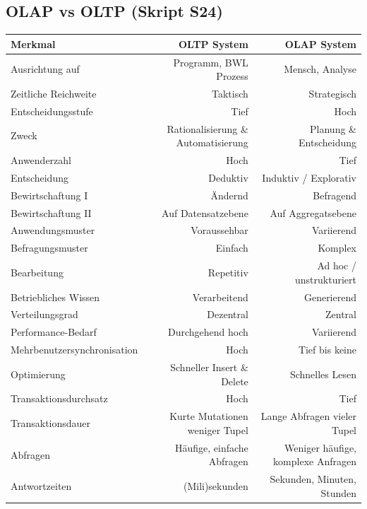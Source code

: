\documentclass[a4paper, 11pt, nofootinbib]{article}
\begin{document}
\begin{landscape}
\subsection{OLAP vs OLTP (Skript S24)}
	
	\centering
	
	\begin{tabular}[htbp]{|l|r|r|}
		\hline 
		Merkmal & OLTP System  & OLAP System  \\ 
		\hline 
		Ausrichtung auf & Programm, BWL Prozess & Mensch, Analyse\\ 
		\hline 
		Zeitliche Reichweite & Taktisch & Strategisch \\ 
		\hline 
		Entscheidungsstufe & Tief & Hoch \\ 
		\hline
		Zweck & Rationalisierung \& Automatisierung & Planung \& Entscheidung \\
		\hline
		Anwenderzahl &Hoch & Tief \\
		\hline
		Entscheidung & Deduktiv & Induktiv / Explorativ \\
		\hline
		Bewirtschaftung I & Ändernd & Befragend \\
		\hline
		Bewirtschaftung II & Auf Datensatzebene & Auf Aggregatsebene \\
		\hline
		Anwendungsmuster & Voraussehbar & Variierend \\
		\hline
		Befragungsmuster & Einfach & Komplex \\
		\hline
		Bearbeitung & Repetitiv & Ad hoc / unstrukturiert \\
		\hline
		Betriebliches Wissen & Verarbeitend & Generierend \\
		\hline
		Verteilungsgrad & Dezentral & Zentral \\
		\hline
		Performance-Bedarf & Durchgehend hoch & Variierend \\
		\hline
		Mehrbenutzersynchronisation & Hoch & Tief bis keine \\
		\hline
		Optimierung & Schneller Insert \& Delete & Schnelles Lesen \\
		\hline
		Transaktionsdurchsatz & Hoch & Tief \\
		\hline
		Transaktionsdauer & Kurte Mutationen weniger Tupel & Lange Abfragen vieler Tupel \\
		\hline
		Abfragen & Häufige, einfache Abfragen & Weniger häufige, komplexe Anfragen \\
		\hline
		Antwortzeiten & (Mili)sekunden & Sekunden, Minuten, Stunden \\

\end{tabular}
\end{landscape}
\end{document}
